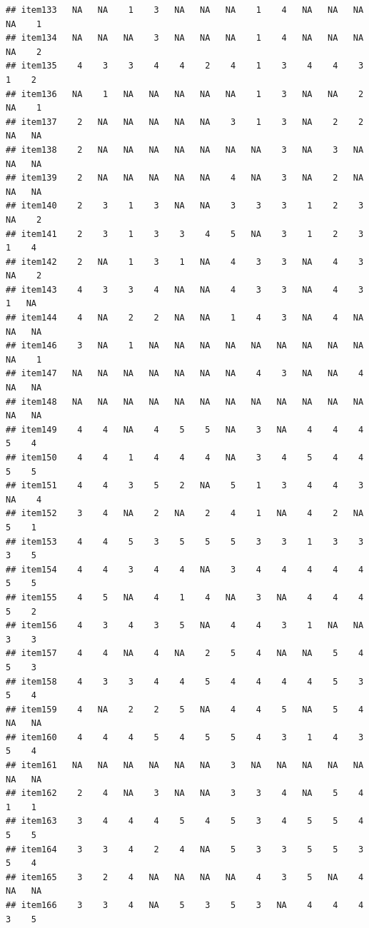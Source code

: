 \documentclass[
  man]{apa6}
\begin{document}
\begin{verbatim}
## item133   NA   NA    1    3   NA   NA   NA    1    4   NA   NA   NA   NA    1
## item134   NA   NA   NA    3   NA   NA   NA    1    4   NA   NA   NA   NA    2
## item135    4    3    3    4    4    2    4    1    3    4    4    3    1    2
## item136   NA    1   NA   NA   NA   NA   NA    1    3   NA   NA    2   NA    1
## item137    2   NA   NA   NA   NA   NA    3    1    3   NA    2    2   NA   NA
## item138    2   NA   NA   NA   NA   NA   NA   NA    3   NA    3   NA   NA   NA
## item139    2   NA   NA   NA   NA   NA    4   NA    3   NA    2   NA   NA   NA
## item140    2    3    1    3   NA   NA    3    3    3    1    2    3   NA    2
## item141    2    3    1    3    3    4    5   NA    3    1    2    3    1    4
## item142    2   NA    1    3    1   NA    4    3    3   NA    4    3   NA    2
## item143    4    3    3    4   NA   NA    4    3    3   NA    4    3    1   NA
## item144    4   NA    2    2   NA   NA    1    4    3   NA    4   NA   NA   NA
## item146    3   NA    1   NA   NA   NA   NA   NA   NA   NA   NA   NA   NA    1
## item147   NA   NA   NA   NA   NA   NA   NA    4    3   NA   NA    4   NA   NA
## item148   NA   NA   NA   NA   NA   NA   NA   NA   NA   NA   NA   NA   NA   NA
## item149    4    4   NA    4    5    5   NA    3   NA    4    4    4    5    4
## item150    4    4    1    4    4    4   NA    3    4    5    4    4    5    5
## item151    4    4    3    5    2   NA    5    1    3    4    4    3   NA    4
## item152    3    4   NA    2   NA    2    4    1   NA    4    2   NA    5    1
## item153    4    4    5    3    5    5    5    3    3    1    3    3    3    5
## item154    4    4    3    4    4   NA    3    4    4    4    4    4    5    5
## item155    4    5   NA    4    1    4   NA    3   NA    4    4    4    5    2
## item156    4    3    4    3    5   NA    4    4    3    1   NA   NA    3    3
## item157    4    4   NA    4   NA    2    5    4   NA   NA    5    4    5    3
## item158    4    3    3    4    4    5    4    4    4    4    5    3    5    4
## item159    4   NA    2    2    5   NA    4    4    5   NA    5    4   NA   NA
## item160    4    4    4    5    4    5    5    4    3    1    4    3    5    4
## item161   NA   NA   NA   NA   NA   NA    3   NA   NA   NA   NA   NA   NA   NA
## item162    2    4   NA    3   NA   NA    3    3    4   NA    5    4    1    1
## item163    3    4    4    4    5    4    5    3    4    5    5    4    5    5
## item164    3    3    4    2    4   NA    5    3    3    5    5    3    5    4
## item165    3    2    4   NA   NA   NA   NA    4    3    5   NA    4   NA   NA
## item166    3    3    4   NA    5    3    5    3   NA    4    4    4    3    5

\end{verbatim}
\end{document}
